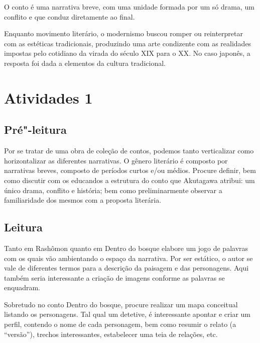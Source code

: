 \documentclass[12pt]{extarticle}
\begin{document}
O conto é uma narrativa breve, com uma unidade formada por um só drama, um
conflito e que conduz diretamente ao final.
 
Enquanto movimento literário, o modernismo buscou romper ou reinterpretar com
as estéticas tradicionais, produzindo uma arte condizente com as realidades
impostas pelo cotidiano da virada do século XIX para o XX.
No caso japonês, a resposta foi dada a elementos da cultura tradicional.



\section{Atividades 1}


\subsection{Pré"-leitura}


Por se tratar de uma obra de coleção de contos, podemos
tanto verticalizar como horizontalizar as diferentes narrativas. O
gênero literário é composto por narrativas breves, composto de períodos
curtos e/ou médios. Procure definir, bem como discutir com os educandos
a estrutura do conto que Akutagawa atribui: um único drama, conflito e
história; bem como preliminarmente observar a familiaridade dos mesmos
com a proposta literária.

\subsection{Leitura}


Tanto em Rashômon quanto em Dentro do bosque elabore um jogo
de palavras com os quais vão ambientando o espaço da narrativa. Por ser
estático, o autor se vale de diferentes termos para a descrição da
paisagem e das personagens. Aqui também seria interessante a criação de
imagens conforme as palavras se enquadram.

Sobretudo no conto Dentro do bosque, procure realizar um mapa conceitual
listando os personagens. Tal qual um detetive, é interessante apontar e
criar um perfil, contendo o nome de cada personagem, bem como resumir o
relato (a ``versão''), trechos interessantes, estabelecer uma teia de
relações, etc.
\end{document}
